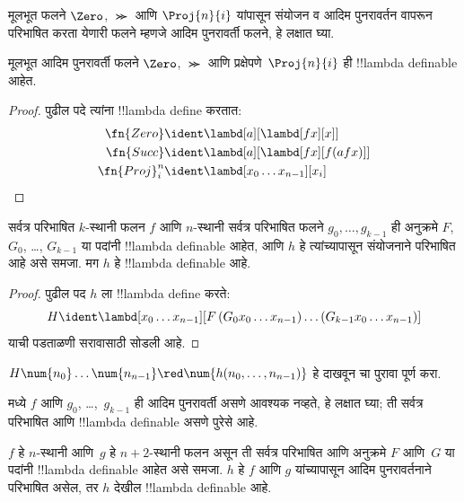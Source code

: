 \documentclass[../../../include/open-logic-section]{subfiles}
\begin{document}

मूलभूत फलने $\Zero$, $\Succ$ आणि $\Proj{n}{i}$
यांपासून संयोजन व आदिम पुनरावर्तन वापरून परिभाषित
करता येणारी फलने म्हणजे आदिम पुनरावर्ती फलने, हे लक्षात घ्या.

\begin{lem}
  मूलभूत आदिम पुनरावर्ती फलने $\Zero$, $\Succ$ आणि
  प्रक्षेपणे~$\Proj{n}{i}$ ही !!{lambda definable} आहेत.
\end{lem}

\begin{proof}
पुढील पदे त्यांना !!{lambda define} करतात:
\begin{align*}
  \fn{Zero} & \ident \lambd[a][\lambd[fx][x]]\\
  \fn{Succ} & \ident \lambd[a][\lambd[fx][f (a f x)]] \\
  \fn{Proj}^n_i & \ident \lambd[x_0\dots x_{n-1}][x_i]
\end{align*}
\end{proof}

\begin{lem}
   सर्वत्र परिभाषित $k$-स्थानी फलन $f$ आणि $n$-स्थानी
  सर्वत्र परिभाषित फलने $g_0, \dots, g_{k-1}$ ही अनुक्रमे $F$, $G_0$,
  \dots, $G_{k-1}$ या पदांनी !!{lambda definable} आहेत,
  आणि $h$ हे त्यांच्यापासून संयोजनाने परिभाषित आहे असे समजा.
  मग $h$ हे !!{lambda definable} आहे.
\end{lem}

\begin{proof}
  पुढील पद $h$ ला !!{lambda define} करते:
  \[
  H \ident \lambd[x_0 \dots x_{n-1}][F\, (G_0 x_0 \dots
    x_{n-1}) \dots (G_{k-1} x_0 \dots x_{n-1})]
  \]
  याची पडताळणी सरावासाठी सोडली आहे.
\end{proof}

\begin{prob}
  $H\num{n_0}\dots\num{n_{n-1}} \red \num{h(n_0, \dots,
    n_{n-1})}$ हे दाखवून 
  चा पुरावा पूर्ण करा.
\end{prob}

 मध्ये $f$ आणि $g_0$,
\dots,~$g_{k-1}$ ही आदिम पुनरावर्ती असणे आवश्यक
नव्हते, हे लक्षात घ्या; ती सर्वत्र परिभाषित आणि
!!{lambda definable} असणे पुरेसे आहे.

\begin{lem}
  $f$ हे $n$-स्थानी आणि~$g$ हे $n+2$-स्थानी फलन
  असून ती सर्वत्र परिभाषित आणि अनुक्रमे $F$ आणि~$G$ या पदांनी
  !!{lambda definable} आहेत असे समजा. $h$ हे
  $f$ आणि $g$ यांच्यापासून आदिम पुनरावर्तनाने परिभाषित असेल,
  तर $h$ देखील !!{lambda definable} आहे.
\end{lem}
\end{document}
